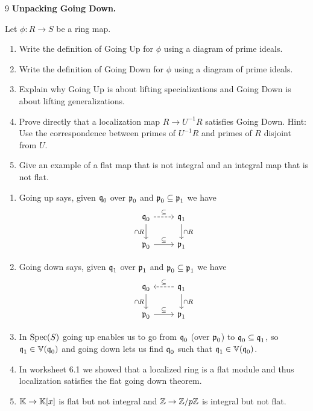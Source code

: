 \documentclass[Notebook.tex]{subfiles}
\begin{document}
\begin{problem}{9}  \textbf{Unpacking Going Down.} 
    
    Let $\phi:R\to S$ be a ring map.
    \begin{enumerate}
        \item Write the definition of Going Up for $\phi$ using a diagram of prime ideals.
        \item Write the definition of Going Down for $\phi$ using a diagram of prime ideals.
        \item Explain why Going Up is about lifting specializations and Going Down is about lifting generalizations.
        \item Prove directly that a localization map $R\to U^{-1}R$ satisfies Going Down. Hint: Use the correspondence between primes of $U^{-1}R$ and primes of $R$ disjoint from $U$.
        \item Give an example of a flat map that is not integral and an integral map that is not flat.
    \end{enumerate}    
\end{problem}
\begin{solution}
    \bbni
    \begin{enumerate}
        \item Going up says, given $\operatorname{\mathfrak{q}}_0$ over $\operatorname{\mathfrak{p}}_0$ and $\operatorname{\mathfrak{p}}_0 \subseteq \operatorname{\mathfrak{p}}_1$ we have
         \[\begin{tikzcd}
            \fq_0 \arrow[d, "\cap R", swap]  \arrow[r, dashed, "\subseteq"] & \fq_1 \arrow[d, "\cap R"] \\ 
            \fp_0 \arrow[r, "\subseteq"] & \fp_1 
        \end{tikzcd}\]

        \item Going down says, given $\operatorname{\mathfrak{q}}_1$ over $\operatorname{\mathfrak{p}}_1$ and $\operatorname{\mathfrak{p}}_0 \subseteq \operatorname{\mathfrak{p}}_1$ we have
         \[\begin{tikzcd}
            \fq_0  \arrow[d, "\cap R", swap] & \fq_1 \arrow[l, dashed, "\subseteq", swap] \arrow[d, "\cap R"] \\ 
            \fp_0  \arrow[r, "\subseteq"] & \fp_1 
        \end{tikzcd}\]

        \item In $\operatorname{Spec}(S)$ going up enables us to go from $\operatorname{\mathfrak{q}}_0$ (over $\operatorname{\mathfrak{p}}_0$) to $\operatorname{\mathfrak{q}}_0 \subseteq \operatorname{\mathfrak{q}}_1$, so $\operatorname{\mathfrak{q}}_1 \in \mathbb V(\operatorname{\mathfrak{q}}_0)$ and going down lets us find $\operatorname{\mathfrak{q}}_0$ such that $\operatorname{\mathfrak{q}}_1 \in \mathbb V(\operatorname{\mathfrak{q}}_0)$. 
        
        \item In worksheet 6.1 we showed that a localized ring is a flat module and thus localization satisfies the flat going down theorem. 
        
        \item $\mathbb K \to \mathbb K[x]$ is flat but not integral and $\mathbb Z \to \mathbb Z/p\mathbb Z$ is integral but not flat. 
    \end{enumerate}
\end{solution}
\end{document}
